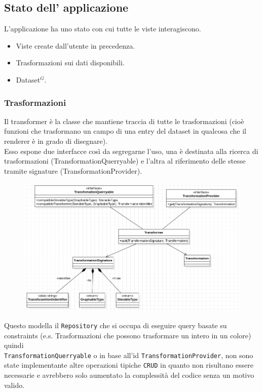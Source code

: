 \subsection{Stato dell' applicazione}
L'applicazione ha uno stato con cui tutte le viste interagiscono.
\begin{itemize}
  \item Viste create dall'utente in precedenza.
  \item Trasformazioni sui dati disponibili.
  \item Dataset$^{G}$.
\end{itemize}

\subsubsection{Trasformazioni}
Il transformer è la classe che mantiene traccia di tutte le trasformazioni (cioè
funzioni che trasformano un campo di una entry del dataset in qualcosa che il
renderer è in grado di disegnare). \\
Esso espone due interfacce così da segregarne l'uso, una è destinata alla ricerca di
trasformazioni (TransformationQuerryable) e l'altra al riferimento delle stesse tramite
signature (TransformationProvider). \\
\begin{figure}[H]
  \centering
  \includegraphics[scale=0.65]{../../assets/classi_uml/modeltransfomer.png}
\end{figure}
Questo modella il \texttt{Repository} che si occupa di eseguire query
basate su constraints (e.s. Trasformazioni che possono trasformare un intero
in un colore) quindi \\ \texttt{TransformationQuerryable} o in base all'id
\texttt{TransformationProvider}, non sono state implementante altre operazioni
tipiche \texttt{CRUD} in quanto non risultano essere necessarie e avrebbero
solo aumentato la complessità del codice senza un motivo valido.

